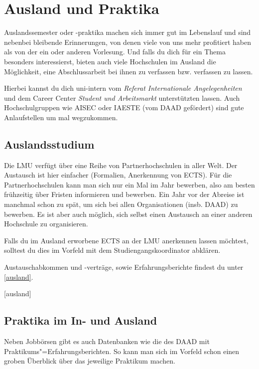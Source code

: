 ﻿\chapter{Ausland und Praktika}

Auslandssemester oder -praktika machen sich immer gut im Lebenslauf
und sind nebenbei bleibende Erinnerungen, von denen viele von uns mehr
profitiert haben als von der ein oder anderen Vorlesung. Und falls du
dich für ein Thema besonders interessierst, bieten auch viele
Hochschulen im Ausland die Möglichkeit, eine Abschlussarbeit bei ihnen
zu verfassen bzw. verfassen zu lassen.

Hierbei kannst du dich uni-intern vom \emph{Referat Internationale Angelegenheiten} und dem Career Center \emph{Student und Arbeitsmarkt} unterstützten lassen. Auch Hochschulgruppen wie AISEC oder IAESTE (vom DAAD gefördert) sind gute Anlaufstellen um mal wegzukommen.

\section{Auslandsstudium}

Die LMU verfügt über eine Reihe von Partnerhochschulen in aller
Welt. Der Austausch ist hier einfacher (Formalien, Anerkennung von
ECTS). Für die
Partnerhochschulen kann man sich nur ein Mal im Jahr bewerben, also am
besten frühzeitig über Fristen informieren und bewerben.
Ein Jahr vor der Abreise ist manchmal schon zu spät, um sich bei
allen Organisationen (insb. DAAD) zu bewerben.
Es ist aber auch möglich, sich selbst einen Austausch an einer anderen
Hochschule zu organisieren.

Falls du im Ausland erworbene ECTS an der LMU anerkennen lassen
möchtest, solltest du dies im Vorfeld mit dem Studiengangskoordinator
abklären.

Austauschabkommen und -verträge, sowie Erfahrungsberichte findest du unter \ref{ausland}.

\begin{urlList}
	[ausland]
\end{urlList}

\section{Praktika im In- und Ausland}

Neben Jobbörsen gibt es auch Datenbanken wie die des DAAD mit
Praktikums"=Erfahrungsberichten. So kann man sich im Vorfeld schon
einen groben Überblick über das jeweilige Praktikum machen.


